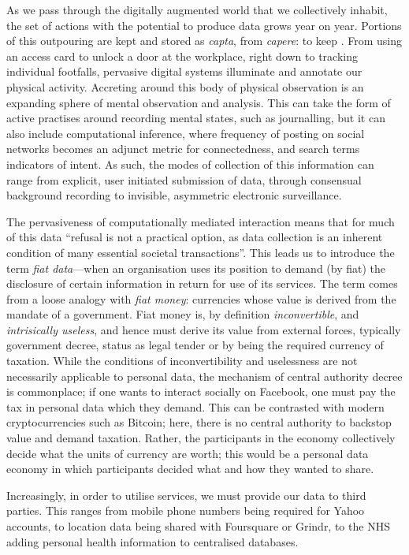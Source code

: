 \documentclass{IOS-Book-Article}     %
\newcommand{\tbox}[3][red]{{
\color{#1}\noindent{
   \fbox{\scriptsize{ {\bf #2} \textsl{#3}}}
   \vspace{2pt}
}
}}
\newcommand{\todo}[1]{\tbox{TODO:}{#1}}
\begin{document}
As we pass through the digitally augmented world that we collectively inhabit,
the set of actions with the potential to produce data grows year on year.
Portions of this outpouring are kept and stored as
\emph{capta}, from \emph{capere}: to keep \cite{dodge2005codes}. From
using an access card to unlock a door at the workplace, right down to tracking
individual footfalls, pervasive digital systems illuminate and annotate our
physical activity. Accreting around this body of physical observation is an
expanding sphere of mental observation and analysis. This can take the form of
active practises around recording mental states, such as journalling, but it can
also include computational inference, where frequency of posting on social
networks becomes an adjunct metric for connectedness, and search terms 
indicators of intent. As such, the modes of collection of this information can
range from explicit, user initiated submission of data, through consensual
background recording to invisible, asymmetric electronic surveillance.

The pervasiveness of computationally mediated interaction means that for much of
this data ``refusal is not a practical option, as data collection is an
inherent condition of many essential societal
transactions''\cite{brunton2011vernacular}. This leads us to introduce the term \emph{fiat data}---when an
organisation uses its position to demand (by fiat) the disclosure of certain
information in return for use of its services. The term comes from a loose
analogy with \emph{fiat money}: currencies whose value is derived from the
mandate of a government. 
\todo{this is gibberish, needs rewriting!}
Fiat money is, by definition
\emph{inconvertible}, and \emph{intrisically useless}, and hence must derive
its value from external forces, typically government decree, status as legal
tender or by being the required currency of taxation. While the conditions of
inconvertibility and uselessness are not necessarily applicable to personal
data, the mechanism of central authority decree is commonplace; if one wants to
interact socially on Facebook, one must pay the tax in personal data which they
demand. This can be contrasted with modern cryptocurrencies such as Bitcoin;
here, there is no central authority to backstop value and demand taxation.
Rather, the participants in the economy collectively decide what the units
of currency are worth; this would be a personal data economy in which
participants decided what and how they wanted to share.

Increasingly, in order to utilise services, we must provide our data to third
parties. This ranges from mobile phone numbers being required for Yahoo
accounts, to location data being shared with Foursquare or Grindr, to the NHS
adding personal health information to centralised databases. 
\end{document}
